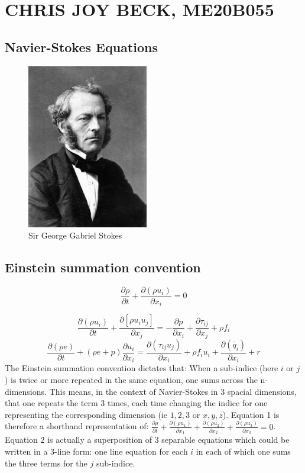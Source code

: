 \section{CHRIS JOY BECK, ME20B055}	
\subsection{Navier-Stokes Equations}
\begin{figure}[h]
	\begin{center}
		\includegraphics[width=200px]{me20b055_1.eps}
	\end{center}
	\caption{Sir George Gabriel Stokes}
	\label{fig:revexp}
	\end{figure}

\subsection{Einstein summation convention}

\begin{equation}
\frac{\partial \rho}{\partial t} + \frac{\partial(\rho u_{i})}{\partial x_{i}} = 0
\end{equation}

\begin{equation}
\frac{\partial (\rho u_{i})}{\partial t} + \frac{\partial[\rho u_{i}u_{j}]}{\partial x_{j}} = -\frac{\partial p}{\partial x_{i}} + \frac{\partial \tau_{ij}}{\partial x_{j}} + \rho f_{i} \end{equation}
\begin{equation}
\frac{\partial (\rho e)}{\partial t} + (\rho e+p)\frac{\partial u_{i}}{\partial x_{i}} = \frac{\partial(\tau_{ij}u_{j})}{\partial x_{i}} + \rho f_{i}u_{i} + \frac{\partial(\dot{ q_{i}})}{\partial x_{i}} + r \end{equation}
The Einstein summation convention dictates that: When a sub-indice (here $i$ or $j$) is twice or more repeated in the same equation, one sums across the n-dimensions. 
This means, in the context of Navier-Stokes in 3 spacial dimensions, that one repeats the term 3 times, each time changing the indice for one representing the corresponding dimension (ie $1,2,3$ or $x,y,z$). Equation 1 is therefore a shorthand representation of: $\frac{\partial \rho}{\partial t}+\frac{\partial(\rho u_{1})}{\partial x_{1}}+\frac{\partial(\rho u_{2})}{\partial x_{2}}+ \frac{\partial(\rho u_{3})}{\partial x_{3}}=0$.
Equation $2$ is actually a superposition of 3 separable equations which could be written in a 3-line form: one line equation for each $i$ in each of which one sums the three terms for the $j$ sub-indice.

